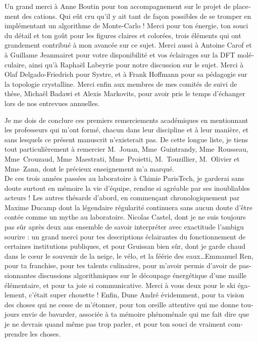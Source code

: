 \begin{otherlanguage}{french}
Un grand merci à Anne Boutin pour ton accompagnement sur le projet de placement des cations. Qui eût cru qu'il y ait tant de façon possibles de se tromper en implémentant un algorithme de Monte-Carlo ! Merci pour ton énergie, ton souci du détail et ton goût pour les figures claires et colorées, trois éléments qui ont grandement contribué à mon avancée sur ce sujet. Merci aussi à Antoine Carof et à Guillame Jeanmairet pour votre disponibilité et vos éclairages sur la DFT moléculaire, ainsi qu'à Raphaël Labeyrie pour notre discussion sur le sujet. Merci à Olaf Delgado-Friedrich pour Systre, et à Frank Hoffmann pour sa pédagogie sur la topologie crystalline. Merci enfin aux membres de mes comités de suivi de thèse, Michaël Badawi et Alexis Markovits, pour avoir pris le temps d'échanger lors de nos entrevues annuelles.

Je me dois de conclure ces premiers remerciements académiques en mentionnant les professeurs qui m'ont formé, chacun dans leur discipline et à leur manière, et sans lesquels ce présent manuscrit n'existerait pas. De cette longue liste, je tiens tout particulièrement à remercier M.~Jouan, Mme~Guintrandy, Mme~Rousseau, Mme~Crouzaud, Mme~Maestrati, Mme~Proietti, M.~Touzillier, M.~Olivier et Mme~Zann, dont le précieux enseignement m'a marqué.\\

De ces trois années passées au laboratoire à Chimie ParisTech, je garderai sans doute surtout en mémoire la vie d'équipe, rendue si agréable par ses inoubliables acteurs ! Les autres thésards d'abord, en commençant chronologiquement par Maxime Ducamp dont la légendaire régularité continuera sans aucun doute d'être contée comme un mythe au laboratoire. Nicolas Castel, dont je ne suis toujours pas sûr après deux ans ensemble de savoir interpréter avec exactitude l'ambigu sourire : un grand merci pour tes descriptions éclairantes du fonctionnement de certaines institutions publiques, et pour Gruissan bien sûr, dont je garde chaud dans le cœur le souvenir de la neige, le vélo, et la féérie des eaux\ldots Emmanuel Ren, pour ta franchise, pour tes talents culinaires, pour m'avoir permis d'avoir de passionnantes discussions algorithmiques sur le découpage énergétique d'une maille élémentaire, et pour ta joie si communicative. Merci à vous deux pour le ski également, c'était super chouette ! Enfin, Dune André évidemment, pour ta vision des choses qui ne cesse de m'étonner, pour ton oreille attentive qui me donne toujours envie de bavarder, associée à ta mémoire phénoménale qui me fait dire que je ne devrais quand même pas trop parler, et pour ton souci de vraiment comprendre les choses.


\end{otherlanguage}
